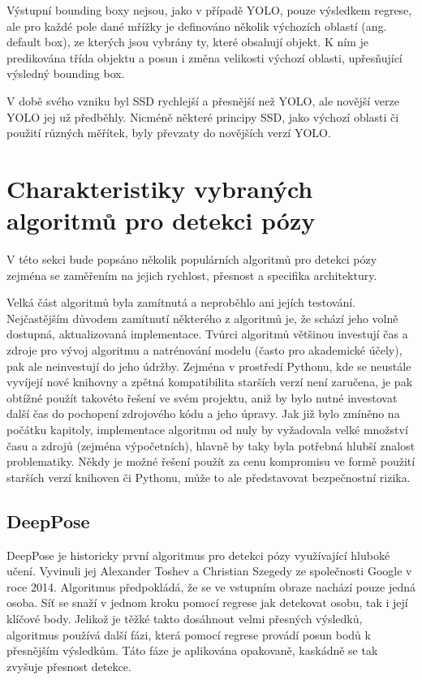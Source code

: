 Výstupní bounding boxy nejsou, jako v případě YOLO, pouze výsledkem regrese,
ale pro každé pole dané mřížky je definováno několik výchozích oblastí (ang.
default box), ze kterých jsou vybrány ty, které obsahují objekt. K ním je
predikována třída objektu a posun i změna velikosti výchozí oblasti,
upřesňující výsledný bounding box.

V době svého vzniku byl SSD rychlejší a přesnější než YOLO, ale novější verze
YOLO jej už předběhly. Nicméně některé principy SSD, jako výchozí oblasti či
použití různých měřítek, byly převzaty do novějších verzí YOLO.

\section{Charakteristiky vybraných algoritmů pro detekci pózy}

V této sekci bude popsáno několik populárních algoritmů pro detekci pózy
zejména se zaměřením na jejich rychlost, přesnost a specifika architektury.

Velká část algoritmů byla zamítnutá a neproběhlo ani jejích testování.
Nejčastějším důvodem zamítnutí některého z algoritmů je, že schází jeho volně
dostupná, aktualizovaná implementace. Tvůrci algoritmů většinou investují čas a
zdroje pro vývoj algoritmu a natrénování modelu (často pro akademické účely),
pak ale neinvestují do jeho údržby. Zejména v prostředí Pythonu, kde se
neustále vyvíjejí nové knihovny a zpětná kompatibilita starších verzí není
zaručena, je pak obtížné použít takovéto řešení ve svém projektu, aniž by bylo
nutné investovat další čas do pochopení zdrojového kódu a jeho úpravy. Jak již
bylo zmíněno na počátku kapitoly, implementace algoritmu od nuly by vyžadovala
velké množství času a zdrojů (zejména výpočetních), hlavně by taky byla
potřebná hlubší znalost problematiky. Někdy je možné řešení použít za cenu
kompromisu ve formě použití starších verzí knihoven či Pythonu, může to ale
představovat bezpečnostní rizika.

\subsection{DeepPose}
DeepPose je historicky první algoritmus pro detekci pózy využívající hluboké
učení. Vyvinuli jej Alexander Toshev a Christian Szegedy ze společnosti Google
v roce 2014. \cite{deeppose} Algoritmus předpokládá, že se ve vstupním obraze
nachází pouze jedná osoba. Síť se snaží v jednom kroku pomocí regrese jak
detekovat osobu, tak i její klíčové body. Jelikož je těžké takto dosáhnout
velmi přesných výsledků, algoritmus používá další fázi, která pomocí regrese
provádí posun bodů k přesnějším výsledkům. Táto fáze je aplikována opakovaně,
kaskádně se tak zvyšuje přesnost detekce.

